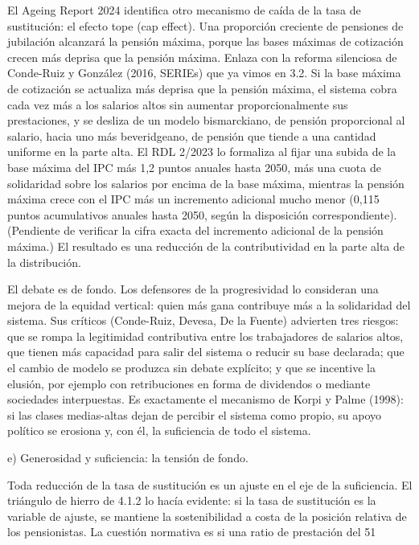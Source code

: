 \documentclass[10pt,a4paper]{article}
\begin{document}
El Ageing Report 2024 identifica otro mecanismo de caída de la tasa de sustitución: el efecto tope (cap effect). Una proporción creciente de pensiones de jubilación alcanzará la pensión máxima, porque las bases máximas de cotización crecen más deprisa que la pensión máxima. Enlaza con la reforma silenciosa de Conde-Ruiz y González (2016, SERIEs) que ya vimos en 3.2. Si la base máxima de cotización se actualiza más deprisa que la pensión máxima, el sistema cobra cada vez más a los salarios altos sin aumentar proporcionalmente sus prestaciones, y se desliza de un modelo bismarckiano, de pensión proporcional al salario, hacia uno más beveridgeano, de pensión que tiende a una cantidad uniforme en la parte alta. El RDL 2/2023 lo formaliza al fijar una subida de la base máxima del IPC más 1,2 puntos anuales hasta 2050, más una cuota de solidaridad sobre los salarios por encima de la base máxima, mientras la pensión máxima crece con el IPC más un incremento adicional mucho menor (0,115 puntos acumulativos anuales hasta 2050, según la disposición correspondiente). (Pendiente de verificar la cifra exacta del incremento adicional de la pensión máxima.) El resultado es una reducción de la contributividad en la parte alta de la distribución.

El debate es de fondo. Los defensores de la progresividad lo consideran una mejora de la equidad vertical: quien más gana contribuye más a la solidaridad del sistema. Sus críticos (Conde-Ruiz, Devesa, De la Fuente) advierten tres riesgos: que se rompa la legitimidad contributiva entre los trabajadores de salarios altos, que tienen más capacidad para salir del sistema o reducir su base declarada; que el cambio de modelo se produzca sin debate explícito; y que se incentive la elusión, por ejemplo con retribuciones en forma de dividendos o mediante sociedades interpuestas. Es exactamente el mecanismo de Korpi y Palme (1998): si las clases medias-altas dejan de percibir el sistema como propio, su apoyo político se erosiona y, con él, la suficiencia de todo el sistema.

e) Generosidad y suficiencia: la tensión de fondo.

Toda reducción de la tasa de sustitución es un ajuste en el eje de la suficiencia. El triángulo de hierro de 4.1.2 lo hacía evidente: si la tasa de sustitución es la variable de ajuste, se mantiene la sostenibilidad a costa de la posición relativa de los pensionistas. La cuestión normativa es si una ratio de prestación del 51%
\end{document}
